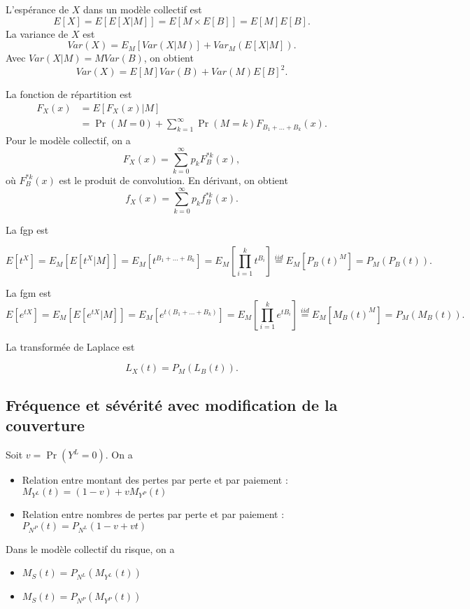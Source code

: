 L'espérance de $X$ dans un modèle collectif est 
$$E[X] = E[E[X \vert M]] = E[M \times E[B]] = E[M]E[B].$$
La variance de $X$ est 
$$Var(X) = E_M[Var(X\vert M)] + Var_M(E[X \vert M]).$$
Avec $Var(X \vert M) = M Var(B)$, on obtient
$$Var(X) = E[M]Var(B) + Var(M)E[B]^2.$$

La fonction de répartition est 
\begin{align*}
	F_X(x) & = E[F_X(x) \vert M]                                                      \\
	       & = \Pr(M = 0) + \sum_{k = 1}^{\infty} \Pr(M = k)F_{B_1 + \dots + B_k}(x).
\end{align*}
Pour le modèle collectif, on a 
$$F_X(x) = \sum_{k = 0}^{\infty} p_k F_B^{*k}(x),$$
où $F_B^{*k}(x)$ est le produit de convolution. En dérivant, on obtient
$$f_X(x) = \sum_{k = 0}^{\infty} p_k f_B^{*k}(x).$$

La fgp est 

$$E\left[t^{X}\right] = E_M\left[E\left[t^{X}\vert M\right]\right] = E_M\left[t^{B_1 + \dots + B_k}\right] = E_M\left[\prod_{i = 1}^{k}t^{B_i}\right] \stackrel{iid}{=} E_M\left[P_B(t)^M\right] = P_M(P_B(t)).$$

La fgm est 
$$E\left[e^{tX}\right] = E_M\left[E\left[e^{tX}\vert M\right]\right] = E_M\left[e^{t(B_1 + \dots + B_k)}\right] = E_M\left[\prod_{i = 1}^{k}e^{tB_i}\right] \stackrel{iid}{=} E_M\left[M_B(t)^M\right] = P_M(M_B(t)).$$

La transformée de Laplace est 

$$L_X(t) = P_M(L_B(t)).$$

\subsection{Fréquence et sévérité avec modification de la couverture}

Soit $v = \Pr(Y^L = 0)$. On a 
\begin{itemize}
	\item Relation entre montant des pertes par perte et par paiement : $\displaystyle M_{Y^L}(t) = (1-v) + vM_{Y^P}(t)$
	\item Relation entre nombres de pertes par perte et par paiement : $\displaystyle P_{N^P}(t) = P_{N^L}(1-v + vt)$
\end{itemize}
Dans le modèle collectif du risque, on a 
\begin{itemize}
	\item $\displaystyle M_S(t) = P_{N^L}\left(M_{Y^L}(t)\right)$
	\item $\displaystyle M_S(t) = P_{N^P}\left(M_{Y^P}(t)\right)$
\end{itemize}

